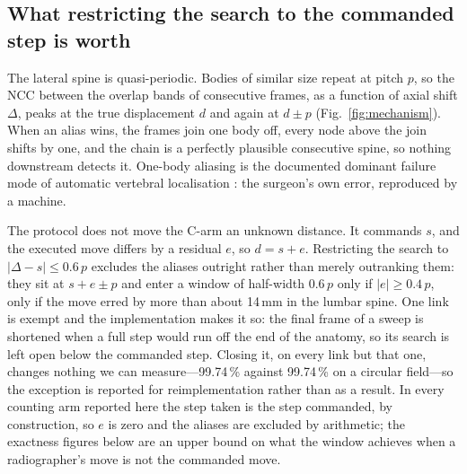 \documentclass[11pt,letterpaper]{article}
\begin{document}
\subsection*{What restricting the search to the commanded step is worth}
The lateral spine is quasi-periodic. Bodies of similar size repeat at pitch $p$, so the NCC between the
overlap bands of consecutive frames, as a function of axial shift $\Delta$, peaks at the true displacement
$d$ and again at $d\pm p$ (Fig.~\ref{fig:mechanism}). When an alias wins, the frames join one body off,
every node above the join shifts by one, and the chain is a perfectly plausible consecutive spine, so
nothing downstream detects it. One-body aliasing is the documented dominant failure mode of automatic
vertebral localisation \citep{otake2012fail}: the surgeon's own error, reproduced by a machine.

The protocol does not move the C-arm an unknown distance. It commands $s$, and the executed move differs by
a residual $e$, so $d=s+e$. Restricting the search to $|\Delta-s|\le 0.6\,p$ excludes the aliases outright
rather than merely outranking them: they sit at $s+e\pm p$ and enter a window of half-width $0.6\,p$ only
if $|e|\ge 0.4\,p$, only if the move erred by more than about 14\,mm in the lumbar spine. One link is
exempt and the implementation makes it so: the final frame of a sweep is shortened when a full step would
run off the end of the anatomy, so its search is left open below the commanded step. Closing it, on every
link but that one, changes nothing we can measure---99.74\,\% against 99.74\,\% on a circular field---so
the exception is reported for reimplementation rather than as a result. In every counting
arm reported here the step taken is the step commanded, by construction, so $e$ is zero and the aliases are
excluded by arithmetic; the exactness figures below are an upper bound on what the window achieves when a
radiographer's move is not the commanded move.
\end{document}
